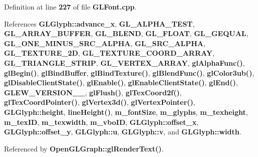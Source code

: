 Definition at line {\bf 227} of file {\bf G\+L\+Font.\+cpp}.



References {\bf G\+L\+Glyph\+::advance\+\_\+x}, {\bf G\+L\+\_\+\+A\+L\+P\+H\+A\+\_\+\+T\+E\+ST}, {\bf G\+L\+\_\+\+A\+R\+R\+A\+Y\+\_\+\+B\+U\+F\+F\+ER}, {\bf G\+L\+\_\+\+B\+L\+E\+ND}, {\bf G\+L\+\_\+\+F\+L\+O\+AT}, {\bf G\+L\+\_\+\+G\+E\+Q\+U\+AL}, {\bf G\+L\+\_\+\+O\+N\+E\+\_\+\+M\+I\+N\+U\+S\+\_\+\+S\+R\+C\+\_\+\+A\+L\+P\+HA}, {\bf G\+L\+\_\+\+S\+R\+C\+\_\+\+A\+L\+P\+HA}, {\bf G\+L\+\_\+\+T\+E\+X\+T\+U\+R\+E\+\_\+2D}, {\bf G\+L\+\_\+\+T\+E\+X\+T\+U\+R\+E\+\_\+\+C\+O\+O\+R\+D\+\_\+\+A\+R\+R\+AY}, {\bf G\+L\+\_\+\+T\+R\+I\+A\+N\+G\+L\+E\+\_\+\+S\+T\+R\+IP}, {\bf G\+L\+\_\+\+V\+E\+R\+T\+E\+X\+\_\+\+A\+R\+R\+AY}, {\bf gl\+Alpha\+Func()}, {\bf gl\+Begin()}, {\bf gl\+Bind\+Buffer}, {\bf gl\+Bind\+Texture()}, {\bf gl\+Blend\+Func()}, {\bf gl\+Color3ub()}, {\bf gl\+Disable\+Client\+State()}, {\bf gl\+Enable()}, {\bf gl\+Enable\+Client\+State()}, {\bf gl\+End()}, {\bf G\+L\+E\+W\+\_\+\+V\+E\+R\+S\+I\+O\+N\+\_\+\_}, {\bf gl\+Flush()}, {\bf gl\+Tex\+Coord2f()}, {\bf gl\+Tex\+Coord\+Pointer()}, {\bf gl\+Vertex3d()}, {\bf gl\+Vertex\+Pointer()}, {\bf G\+L\+Glyph\+::height}, {\bf line\+Height()}, {\bf m\+\_\+font\+Size}, {\bf m\+\_\+glyphs}, {\bf m\+\_\+texheight}, {\bf m\+\_\+tex\+ID}, {\bf m\+\_\+texwidth}, {\bf m\+\_\+vbo\+ID}, {\bf G\+L\+Glyph\+::offset\+\_\+x}, {\bf G\+L\+Glyph\+::offset\+\_\+y}, {\bf G\+L\+Glyph\+::u}, {\bf G\+L\+Glyph\+::v}, and {\bf G\+L\+Glyph\+::width}.



Referenced by {\bf Open\+G\+L\+Graph\+::gl\+Render\+Text()}.



